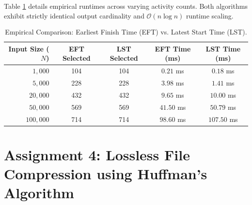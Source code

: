 \documentclass[12pt]{article}
\begin{document}
Table \ref{tab:act_bench} details empirical runtimes across varying activity counts. Both algorithms exhibit strictly identical output cardinality and $\mathcal{O}(n \log n)$ runtime scaling.

\begin{table}[H]
\centering
\caption{Empirical Comparison: Earliest Finish Time (EFT) vs. Latest Start Time (LST).}
\label{tab:act_bench}
\vspace{0.2cm}
\begin{tabular}{rcccc}
\toprule
\textbf{Input Size ($N$)} & \textbf{EFT Selected} & \textbf{LST Selected} & \textbf{EFT Time (ms)} & \textbf{LST Time (ms)} \\
\midrule
$1,000$   & 104 & 104 & $0.21$ ms  & $0.18$ ms \\
$5,000$   & 228 & 228 & $3.98$ ms  & $1.41$ ms \\
$20,000$  & 432 & 432 & $9.65$ ms  & $10.00$ ms \\
$50,000$  & 569 & 569 & $41.50$ ms & $50.79$ ms \\
$100,000$ & 714 & 714 & $98.60$ ms & $107.50$ ms \\
\bottomrule
\end{tabular}
\end{table}

\newpage

\section*{Assignment 4: Lossless File Compression using Huffman's Algorithm}
\end{document}
